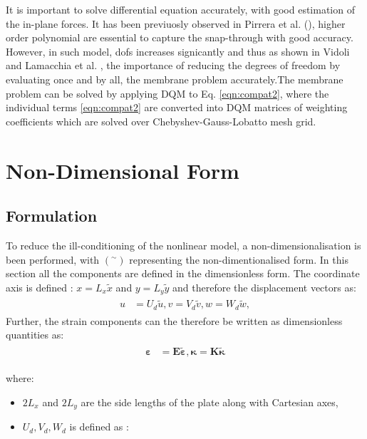 \documentclass[journal]{new-aiaa}
\begin{document}
It is important to solve differential equation accurately, with good estimation of the in-plane forces. It has been previuosly observed in Pirrera et al. (\cite{Pirrera2010}), higher order polynomial are essential to capture the snap-through with good accuracy. However, in such model, dofs increases signicantly and thus as shown in Vidoli \cite{Vidoli2013} and Lamacchia et al. \cite{Lamacchia2015}, the importance of reducing the degrees of freedom by evaluating once and by all, the membrane problem accurately.The membrane problem can be solved by applying DQM to Eq. \ref{eqn:compat2}, where the individual terms \ref{eqn:compat2} are converted into DQM matrices of weighting coefficients which are solved over Chebyshev-Gauss-Lobatto mesh grid.

\section{Non-Dimensional Form}
\subsection{Formulation}
To reduce the ill-conditioning of the nonlinear model, a non-dimensionalisation is been performed, with $( ^{\sim})$  representing the non-dimentionalised form. In this section all the components are defined in the  dimensionless form. The coordinate axis is defined : $x=L_x\tilde{x}$ and $y=L_y\tilde{y} $ and therefore the displacement vectors as:
\begin{eqnarray}
\begin{aligned}
u&=U_d\tilde{u}, v=V_d\tilde{v}, w=W_d\tilde{w}, 
\end{aligned}
\label{eqn:nondimdisp}
\end{eqnarray}
Further, the strain components can the therefore be written as dimensionless quantities as:
\begin{eqnarray}
\begin{aligned}
\boldsymbol{\varepsilon} &= \boldsymbol{E\tilde{\varepsilon}},  \boldsymbol{\kappa}=\boldsymbol{K\tilde{\kappa}}
\end{aligned}
\label{eqn:nondimstrains}
\end{eqnarray}

where:

\begin{itemize}
	\item $2L_x$ and $2L_y$ are the side lengths of the plate along with Cartesian axes,
	\item $U_d, V_d, W_d$ is defined as : \cite{Pirrera2010}\cite{Lamacchia2015} 
\end{itemize}
\end{document}
